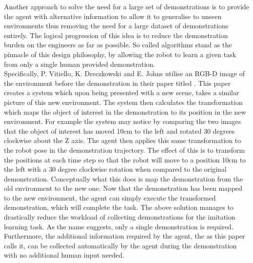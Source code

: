 Another approach to solve the need for a large set of demonstrations is to provide the agent with alternative information to allow it to generalise to unseen environments thus removing the need for a large dataset of demonstrations entirely. The logical progression of this idea is to reduce the demonstration burden on the engineers as far as possible. So called  algorithms stand as the pinnacle of this design philosophy, by allowing the robot to learn a given task from only a single human provided demonstration.\\

Specifically, P. Vitiello, K. Dreczkowski and E. Johns utilise an RGB-D image of the environment before the demonstration in their paper titled  \cite{one-shot-pose-estimate}. This paper creates a system which upon being presented with a new scene, takes a similar picture of this new environment. The system then calculates the transformation which maps the object of interest in the demonstration to its position in the new environment. For example the system may notice by comparing the two images that the object of interest has moved 10cm to the left and rotated 30 degrees clockwise about the Z axis. The agent then applies this same transformation to the robot pose in the demonstration trajectory. The effect of this is to transform the positions at each time step so that the robot will move to a position 10cm to the left with a 30 degree clockwise rotation when compared to the original demonstration. Conceptually what this does is map the demonstration from the old environment to the new one. Now that the demonstration has been mapped to the new environment, the agent can simply execute the transformed demonstration, which will complete the task. The above solution manages to drastically reduce the workload of collecting demonstrations for the imitation learning task. As the name  suggests, only a single demonstration is required. Furthermore, the additional information required by the agent, the  as this paper calls it, can be collected automatically by the agent during the demonstration with no additional human input needed.\\


